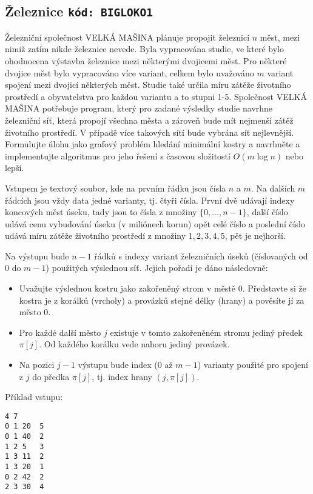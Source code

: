 \documentclass[a4paper,10pt]{article}
\begin{document}
\subsection{Železnice \hfill{\tt kód: BIGLOKO1}}
Železniční společnost VELKÁ MAŠINA plánuje propojit železnicí $n$ měst, mezi nimiž zatím nikde železnice nevede. Byla vypracována studie, ve které bylo ohodnocena
výstavba železnice mezi některými dvojicemi měst. Pro některé dvojice měst bylo vypracováno více variant, celkem bylo uvažováno 
$m$ variant spojení mezi dvojicí některých měst. 
Studie také určila míru zátěže životního prostředí a obyvatelstva pro každou variantu a to stupni 1-5. 
Společnost VELKÁ MAŠINA potřebuje program, který pro zadané výsledky studie navrhne železniční síť, která propojí všechna města
a zároveň bude mít nejmenší zátěž životního prostředí. V případě více takových síťí bude vybrána síť nejlevnější.
Formulujte úlohu jako grafový problém hledání minimální kostry a navrhněte a implementujte algoritmus pro jeho řešení s časovou složitostí $O(m \log n)$ nebo lepší.

Vstupem je textový soubor, kde na prvním řádku jsou čísla $n$ a $m$. Na dalších $m$ řádcích jsou vždy data jedné varianty, tj. čtyři čísla. 
První dvě udávají indexy koncových měst úseku, tady jsou to čísla z množiny $\{0,\dots,n-1\}$, další číslo udává cenu vybudování úseku (v miliónech korun) 
opět celé číslo a poslední číslo udává míru zátěže životního prostředí z množiny ${1,2,3,4,5}$, pět je nejhorší. 

Na výstupu bude $n-1$ řádků s indexy variant železničních úseků (číslovaných od $0$ do $m-1$) použitých výslednou síť. Jejich pořadí je dáno následovně:
\begin{itemize}
 \item Uvažujte výslednou kostru jako zakořeněný strom v městě $0$. Představte si že kostra je z korálků (vrcholy) a provázků stejné délky (hrany) a pověsíte jí za město $0$.
 \item Pro každé další město $j$ existuje v tomto zakořeněném stromu jediný předek $\pi[j]$. Od každého korálku vede nahoru jediný provázek.
 \item   Na pozici $j-1$ výstupu bude index ($0$ až $m-1$)
varianty použité pro spojení z $j$ do předka $\pi[j]$, tj. index hrany $(j, \pi[j])$.
\end{itemize}



Příklad vstupu:
\begin{verbatim}
4 7
0 1 20  5
0 1 40  2
1 2 5   3
1 3 11  2
1 3 20  1
0 2 42  2 
2 3 30  4
\end{verbatim}
\end{document}
